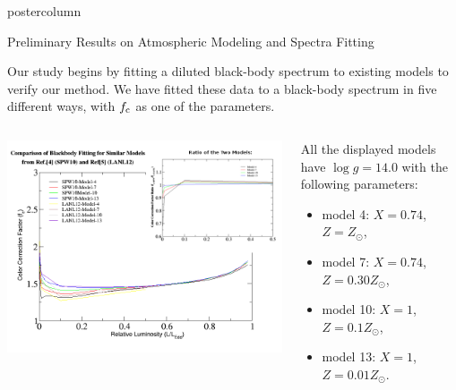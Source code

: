 \documentclass[final]{beamer}
\begin{document}
\begin{frame}
\begin{columns}
\begin{column}{.49\textwidth}
\begin{beamercolorbox}[center,wd=\textwidth]{postercolumn}
\begin{minipage}[T]{.95\textwidth}
{\begin{block}{Preliminary Results on  Atmospheric Modeling and Spectra Fitting }

Our study begins by fitting a diluted black-body spectrum to existing
models \cite{5} \cite{6} to verify our method. We have fitted these data to a black-body spectrum in five different ways, with $f_{\rm c}$ as one of the parameters. 


  \begin{columns}
\begin{column}{0.7\textwidth} 

\quad

\begin{center}
		\includegraphics[width=0.95\linewidth]{models.png}
		\end{center}
  \end{column}
\begin{column}{0.3\textwidth} 

{\scriptsize All the displayed models have $\log g = 14.0$ with the following parameters:}

\quad

 	\begin{itemize}
 	\item {\scriptsize model 4: $X=0.74$, $Z=Z_{\odot}$,}
 	\item {\scriptsize model 7: $X=0.74$, $Z=0.30Z_{\odot}$,}
 	\item {\scriptsize model 10: $X=1$, $Z=0.1Z_{\odot}$,}
 	\item {\scriptsize model 13: $X=1$, $Z=0.01Z_{\odot}$.}  	
	\end{itemize}


\end{column}
\end{columns}
\end{block}}
\end{minipage}
\end{beamercolorbox}
\end{column}
\end{columns}
\end{frame}
\end{document}
